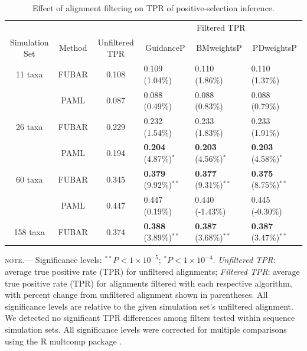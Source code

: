 \documentclass[10pt]{article}
\begin{document}
\begin{table}
\caption {\label{tab:casemodel} Effect of alignment filtering on TPR of positive-selection inference.}
\begin{tabular}{c c c l l l}
\hline\noalign{\smallskip}
& & & \multicolumn{3}{c}{Filtered TPR} \\
\cline{4-6}\noalign{\smallskip}
Simulation Set & Method & Unfiltered TPR & \multicolumn{1}{c}{GuidanceP} & \multicolumn{1}{c}{BMweightsP} & \multicolumn{1}{c}{PDweightsP} \\ 
\hline\noalign{\smallskip}
11 taxa  & FUBAR & 0.108 & 0.109  (1.04\%)   & 0.110  (1.86\%)  & 0.110  (1.37\%)        \\
              & PAML &  0.087 & 0.088  (0.49\%) &  0.088  (0.83\%)   & 0.088  (0.79\%)        \\
\hline
26 taxa   & FUBAR &  0.229 & 0.232 (1.54\%)  & 0.233 (1.83\%) & 0.233 (1.91\%)         \\
              & PAML & 0.194 & \textbf{0.204} (4.87\%)$^{\ast}$ & \textbf{0.203} (4.56\%)$^{\ast}$ & \textbf{0.203} (4.58\%)$^{\ast}$   \\
\hline
60 taxa  & FUBAR & 0.345 & \textbf{0.379} (9.92\%)$^{\ast\ast}$ & \textbf{0.377} (9.31\%)$^{\ast\ast}$ & \textbf{0.375} (8.75\%)$^{\ast\ast}$  \\
              & PAML & 0.447 & 0.447 (0.19\%) & 0.440 (-1.43\%) & 0.445 (-0.30\%) \\
\hline
158 taxa & FUBAR & 0.374 & \textbf{0.388} (3.89\%)$^{\ast\ast}$ & \textbf{0.387} (3.68\%)$^{\ast\ast}$ & \textbf{0.387} (3.47\%)$^{\ast\ast}$  \\
\hline
\end{tabular}
\newline
\textsc{note.}--- Significance levels: $^{\ast\ast} P < 1\times10^{-5}$; $^{\ast} P < 1\times10^{-4}$. \textit{Unfiltered TPR}: average true positive rate (TPR) for unfiltered alignments; \textit{Filtered TPR}: average true positive rate (TPR) for alignments filtered with each respective algorithm, with percent change from unfiltered alignment shown in parentheses. All significance levels are relative to the given simulation set's unfiltered alignment. We detected no significant TPR differences among filters tested within sequence simulation sets. All significance levels were corrected for multiple comparisons using the R multcomp package \citep{Hothorn2008}.

\end{table}
\end{document}

